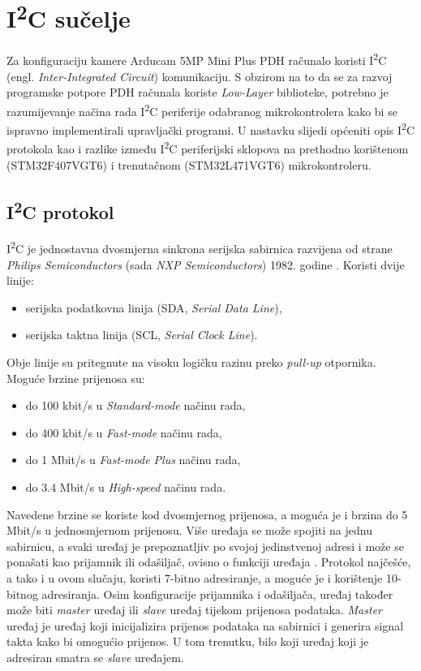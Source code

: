 \chapter{I\textsuperscript{2}C sučelje}

Za konfiguraciju kamere Arducam 5MP Mini Plus  PDH računalo koristi I\textsuperscript{2}C (engl. \textit{Inter-Integrated Circuit}) komunikaciju. S obzirom na to da se za razvoj programske potpore PDH računala koriste \textit{Low-Layer} biblioteke, potrebno je razumijevanje načina rada I\textsuperscript{2}C periferije odabranog mikrokontrolera kako bi se ispravno implementirali upravljački programi. U nastavku slijedi općeniti opis I\textsuperscript{2}C protokola kao i razlike između I\textsuperscript{2}C periferijski sklopova na prethodno korištenom (STM32F407VGT6) i trenutačnom (STM32L471VGT6) mikrokontroleru.

\section{I\textsuperscript{2}C protokol}

I\textsuperscript{2}C je jednostavna dvosmjerna sinkrona serijska sabirnica razvijena od strane \textit{Philips Semiconductors} (sada \textit{NXP Semiconductors}) 1982. godine \cite{i2c_wikipedia}. Koristi dvije linije:
\begin{itemize}
	\item serijska podatkovna linija (SDA, \textit{Serial Data Line}),
	\item serijska taktna linija (SCL, \textit{Serial Clock Line}).
\end{itemize}
Obje linije su pritegnute na visoku logičku razinu preko \textit{pull-up} otpornika. Moguće brzine prijenosa su:
\begin{itemize}
	\item do 100 kbit/s u \textit{Standard-mode} načinu rada, 
	\item do 400 kbit/s u \textit{Fast-mode} načinu rada,
	\item do 1 Mbit/s u \textit{Fast-mode Plus} načinu rada,
	\item do 3.4 Mbit/s u \textit{High-speed} načinu rada.
\end{itemize}
Navedene brzine se koriste kod dvosmjernog prijenosa, a moguća je i brzina do 5 Mbit/s u jednosmjernom prijenosu. Više uređaja se može spojiti na jednu sabirnicu, a svaki uređaj je prepoznatljiv po svojoj jedinstvenoj adresi i može se ponašati kao prijamnik ili odašiljač, ovisno o funkciji uređaja \cite{i2c_manual}. Protokol najčešće, a tako i u ovom slučaju, koristi 7-bitno adresiranje, a moguće je i korištenje 10-bitnog adresiranja. Osim konfiguracije prijamnika i odašiljača, uređaj također može biti \textit{master} uređaj ili \textit{slave} uređaj tijekom prijenosa podataka. \textit{Master} uređaj je uređaj koji inicijalizira prijenos podataka na sabirnici i generira signal takta kako bi omogućio prijenos. U tom trenutku, bilo koji uređaj koji je adresiran smatra se \textit{slave} uređajem.


